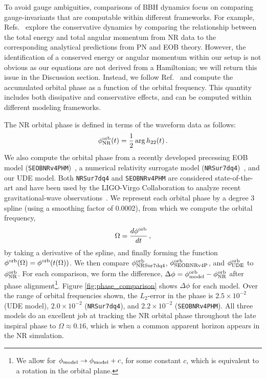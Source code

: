 \documentclass[ reprint,
nofootinbib,
 amsmath,amssymb,
 aps,
]{revtex4-2}
\begin{document}
To avoid gauge ambiguities, comparisons of BBH dynamics focus on comparing gauge-invariants that are computable within different frameworks. For example, Refs.~\cite{damour2012energy,nagar2016energetics} explore the conservative dynamics by comparing the relationship between the total energy and total angular momentum from NR data  to the corresponding analytical predictions from PN and EOB theory. However, the identification of a conserved energy or angular momentum within our setup is not obvious as our equations are not derived from a Hamiltonian; we will return this issue in the Discussion section. Instead, we follow Ref.~\cite{van2020intermediate} and compute the accumulated orbital phase as a function of the orbital frequency. This quantity includes both dissipative and conservative effects, and can be computed within different modeling frameworks.

The NR orbital phase is defined in terms of the waveform data as follows:
\begin{equation}
\label{eq:nr_orbital_phase}
\phi_{\rm NR}^{\rm orb}(t) =\frac{1}{2} \arg h_{22}(t) \,.
\end{equation}
We also compute the orbital phase from a recently developed precessing
EOB model ({\tt SEOBNRv4PHM})~\cite{ossokine2020multipolar}, a numerical relativity surrogate model ({\tt NRSur7dq4})~\cite{varma2019surrogate}, and our UDE model. Both {\tt NRSur7dq4} and {\tt SEOBNRv4PHM} are considered state-of-the-art and have been used by the LIGO-Virgo Collaboration to analyze recent gravitational-wave observations~\cite{abbott2020gw190521,abbott2020gw190412,abbott2020gwtc}. We represent each orbital phase by a degree 3 spline (using a smoothing factor of 0.0002), from which we compute the orbital frequency,
\begin{equation}
\label{eq:orbital_frequency}
\Omega = \frac{d \phi^{\rm orb}}{dt} \,,
\end{equation}
by taking a derivative of the spline, and finally forming the function $\phi^{\rm orb}(\Omega) = \phi^{\rm orb}(t(\Omega))$. We then compare $\phi_{\rm NRSur7dq4}^{\rm orb}$, $\phi_{\rm SEOBNRv4P}^{\rm orb}$, and $\phi_{\rm UDE}^{\rm orb}$ to $\phi_{\rm NR}^{\rm orb}$. For each comparison, we form the difference, $\Delta \phi = \phi_{\rm model}^{\rm orb} - \phi_{\rm NR}^{\rm orb}$ after phase alignment\footnote {We allow for $\phi_{\rm model} \rightarrow \phi_{\rm model} + c$, for some constant $c$, which is equivalent to a rotation in the orbital plane.}. Figure \ref{fig:phase_comparison} shows $\Delta \phi$ for each model. Over the range of orbital frequencies shown, the $L_2$-error in the phase is $2.5\times 10^{-2}$ (UDE model), $2.0\times 10^{-2}$ ({\tt NRSur7dq4}), and $2.2 \times 10^{-2}$ ({\tt SEOBNRv4PHM}). All three models do an excellent job at tracking the NR orbital phase throughout the late inspiral phase to $\Omega \approx 0.16$, which is when a common apparent horizon appears in the NR simulation.
\end{document}
